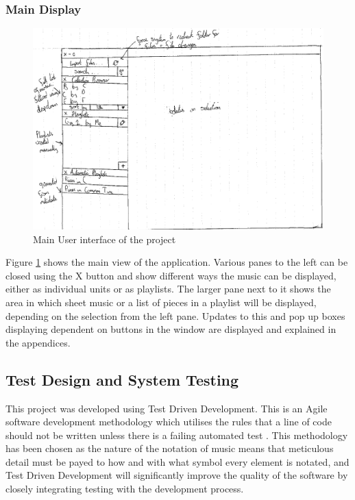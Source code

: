 \subsubsection{Main Display}
\begin{figure}[H]
    \includegraphics[width=400pt]{designs/main}
    \caption{Main User interface of the project}
    \label{fig:main}
\end{figure}
Figure \ref{fig:main} shows the main view of the application. Various panes to the left can be closed using the X button and show different ways the music can be displayed, either as individual units or as playlists. The larger pane next to it shows the area in which sheet music or a list of pieces in a playlist will be displayed, depending on the selection from the left pane. Updates to this and pop up boxes displaying dependent on buttons in the window are displayed and explained in the appendices.

\subsection{Test Design and System Testing}
This project was developed using Test Driven Development. This is an Agile software development methodology which utilises the rules that a line of code should not be written unless there is a failing automated test \parencite{TDD}. This methodology has been chosen as the nature of the notation of music means that meticulous detail must be payed to how and with what symbol every element is notated, and Test Driven Development will significantly improve the quality of the software by closely integrating testing with the development process.


